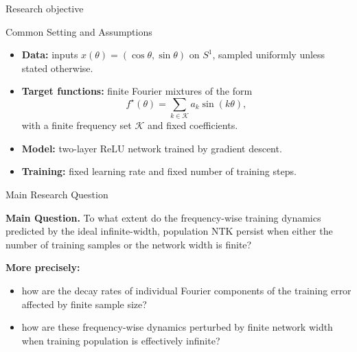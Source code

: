 \documentclass[10pt,aspectratio=169]{beamer}
\begin{document}
\begin{frame}
	\huge Research objective
\end{frame}

\begin{frame}{Common Setting and Assumptions}

	\begin{itemize}
		\item \textbf{Data:} inputs $x(\theta)=(\cos\theta,\sin\theta)$ on $S^1$,
		      sampled uniformly unless stated otherwise.
		\item \textbf{Target functions:} finite Fourier mixtures of the form
		      \[
			      f^\star(\theta)
			      =
			      \sum_{k \in \mathcal{K}} a_k \sin(k\theta),
		      \]
		      with a finite frequency set $\mathcal{K}$ and fixed coefficients.
		\item \textbf{Model:} two-layer ReLU network trained by gradient descent.
		\item \textbf{Training:} fixed learning rate and fixed number of training steps.
	\end{itemize}

\end{frame}

\begin{frame}{Main Research Question}

	\textbf{Main Question.}
	To what extent do the frequency-wise training dynamics predicted by the ideal
	infinite-width, population NTK persist when either the number of training samples
	or the network width is finite?

	\vspace{0.6em}

	\textbf{More precisely:}
	\begin{itemize}
		\item how are the decay rates of individual Fourier components of the training error
		      affected by finite sample size?
		      \pause
		\item how are these frequency-wise dynamics perturbed by finite network width
		      when training population is effectively infinite?
	\end{itemize}

\end{frame}
\end{document}
